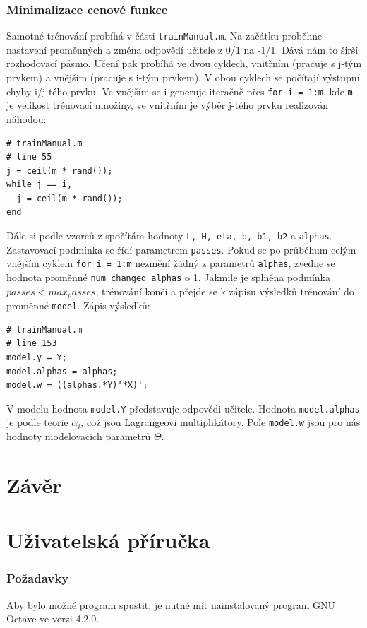 \documentclass[a4]{article}
\begin{document}
\subsubsection{Minimalizace cenové funkce}
Samotné trénování probíhá v části \texttt{trainManual.m}. Na začátku proběhne nastavení proměnných a změna odpovědí učitele z 0/1 na -1/1. Dává nám to širší rozhodovací pásmo. Učení pak probíhá ve dvou cyklech, vnitřním (pracuje s j-tým prvkem) a vnějším (pracuje s i-tým prvkem). V obou cyklech se počítají výstupní chyby i/j-tého prvku. Ve vnějším se i generuje iteračně přes \texttt{for i = 1:m}, kde \texttt{m} je velikost trénovací množiny, ve vnitřním je výběr j-tého prvku realizován náhodou:

\begin{lstlisting}
# trainManual.m
# line 55
j = ceil(m * rand());
while j == i,
  j = ceil(m * rand());
end
\end{lstlisting}

Dále si podle vzorců z \cite{smo_platt_original} spočítám hodnoty \texttt{L, H, eta, b, b1, b2} a \texttt{alphas}. Zastavovací podmínka se řídí parametrem \texttt{passes}. Pokud se po průběhum celým vnějším cyklem \texttt{for i = 1:m} nezmění žádný z parametrů \texttt{alphas}, zvedne se hodnota proměnné \texttt{num\_changed\_alphas} o 1. Jakmile je splněna podmínka $passes < max_passes$, trénování končí a přejde se k zápisu výsledků trénování do proměnné \texttt{model}. Zápis výsledků:

\begin{lstlisting}
# trainManual.m
# line 153
model.y = Y;
model.alphas = alphas;
model.w = ((alphas.*Y)'*X)';
\end{lstlisting}

V modelu hodnota \texttt{model.Y} představuje odpovědi učitele. Hodnota \texttt{model.alphas} je podle teorie $\alpha_i$, což jsou Lagrangeovi multiplikátory. Pole \texttt{model.w} jsou pro nás hodnoty modelovacích parametrů $\Theta$.

\newpage

\section{Závěr}

\section{Uživatelská příručka}
\subsubsection{Požadavky}
Aby bylo možné program spustit, je nutné mít nainstalovaný program GNU Octave ve verzi 4.2.0.
\end{document}
